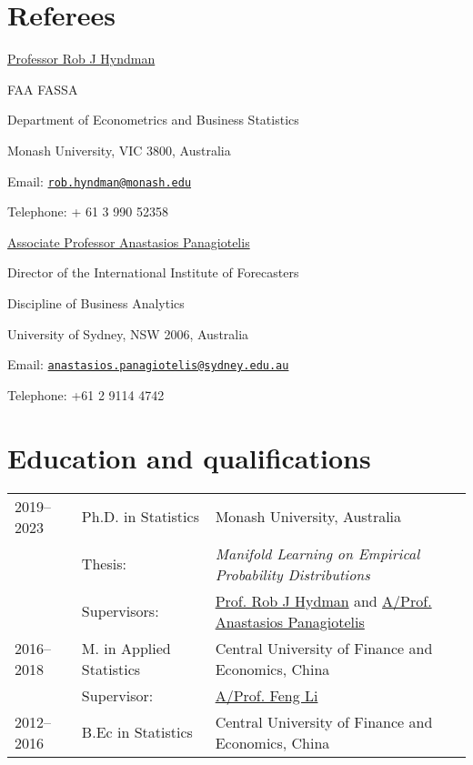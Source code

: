 \documentclass[10pt,a4paper,]{article}
\begin{document}
\section{Referees}\label{referees}

\href{https://robjhyndman.com/}{Professor Rob J Hyndman}

FAA FASSA

Department of Econometrics and Business Statistics

Monash University, VIC 3800, Australia

Email:
\href{mailto:rob.hyndman@monash.edu}{\nolinkurl{rob.hyndman@monash.edu}}

Telephone: + 61 3 990 52358

\bigskip

\href{https://anastasiospanagiotelis.netlify.app/}{Associate Professor Anastasios Panagiotelis}

Director of the International Institute of Forecasters

Discipline of Business Analytics

University of Sydney, NSW 2006, Australia

Email:
\href{mailto:anastasios.panagiotelis@sydney.edu.au}{\nolinkurl{anastasios.panagiotelis@sydney.edu.au}}

Telephone: +61 2 9114 4742

\thispagestyle{empty}

\section{Education and
qualifications}\label{education-and-qualifications-1}

\begin{tabular}{lll}
  2019--2023 & Ph.D. in Statistics & Monash University, Australia \\ 
        & Thesis: & \emph{Manifold Learning on Empirical Probability Distributions} \\
        & Supervisors: & \href{https://robjhyndman.com/}{Prof. Rob J Hydman} and \href{https://anastasiospanagiotelis.netlify.app/}{A/Prof. Anastasios Panagiotelis} \\        
  2016--2018 & M. in Applied Statistics & Central University of Finance and Economics, China \\ 
        & Supervisor: & \href{https://feng.li/}{A/Prof. Feng Li} \\
  2012--2016 & B.Ec in Statistics & Central University of Finance and Economics, China \\ 
\end{tabular}
\end{document}
